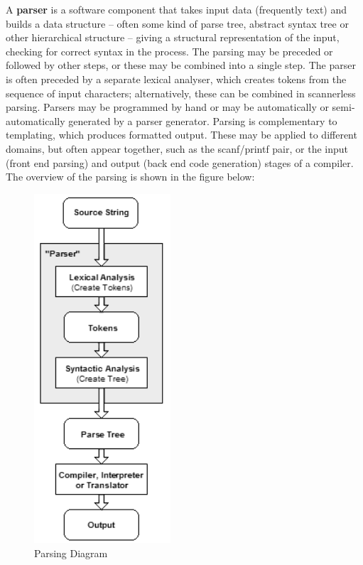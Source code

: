 \documentclass[document.tex]{subfiles}
\begin{document}
A \textbf{parser} is a software component that takes input data (frequently text) and builds a data structure – often some kind of parse tree, abstract syntax tree or other hierarchical structure – giving a structural representation of the input, checking for correct syntax in the process. The parsing may be preceded or followed by other steps, or these may be combined into a single step. The parser is often preceded by a separate lexical analyser, which creates tokens from the sequence of input characters; alternatively, these can be combined in scannerless parsing. Parsers may be programmed by hand or may be automatically or semi-automatically generated by a parser generator. Parsing is complementary to templating, which produces formatted output. These may be applied to different domains, but often appear together, such as the scanf/printf pair, or the input (front end parsing) and output (back end code generation) stages of a compiler. The overview of the parsing is shown in the figure below:
\begin{figure}[H]
	\begin{center}
		\includegraphics[height=13.0cm]{imgs/Parser.png}
	\end{center}
	\caption{Parsing Diagram}
	\label{fig:parsing}
\end{figure}
\end{document}
